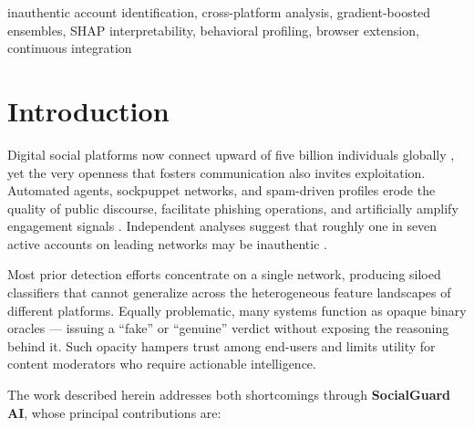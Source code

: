 \documentclass[conference]{IEEEtran}
\begin{document}
\begin{IEEEkeywords}
inauthentic account identification, cross-platform analysis, gradient-boosted ensembles, SHAP interpretability, behavioral profiling, browser extension, continuous integration
\end{IEEEkeywords}

\section{Introduction}

Digital social platforms now connect upward of five billion individuals globally \cite{statista2026}, yet the very openness that fosters communication also invites exploitation. Automated agents, sockpuppet networks, and spam-driven profiles erode the quality of public discourse, facilitate phishing operations, and artificially amplify engagement signals \cite{cresci2020decade, ferrara2016rise}. Independent analyses suggest that roughly one in seven active accounts on leading networks may be inauthentic \cite{varol2017}.

Most prior detection efforts concentrate on a single network, producing siloed classifiers that cannot generalize across the heterogeneous feature landscapes of different platforms. Equally problematic, many systems function as opaque binary oracles --- issuing a ``fake'' or ``genuine'' verdict without exposing the reasoning behind it. Such opacity hampers trust among end-users and limits utility for content moderators who require actionable intelligence.

The work described herein addresses both shortcomings through \textbf{SocialGuard AI}, whose principal contributions are:
\end{document}
